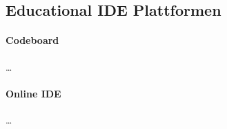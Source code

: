 \subsection{Educational IDE Plattformen}\label{section:stand-der-technik:weitere-entwicklungen:educational-ide-plattformen}

\paragraph{Codeboard} \dots

\paragraph{Online IDE} \dots

\paragraph{}

